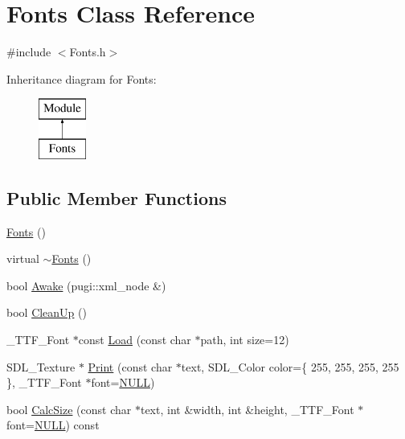 \hypertarget{class_fonts}{}\section{Fonts Class Reference}
\label{class_fonts}


{\ttfamily \#include $<$Fonts.\+h$>$}

Inheritance diagram for Fonts\+:\begin{figure}[H]
\begin{center}
\leavevmode
\includegraphics[height=2.000000cm]{class_fonts}
\end{center}
\end{figure}
\subsection*{Public Member Functions}
\begin{DoxyCompactItemize}
\item 
\mbox{\hyperlink{class_fonts_a45eefc38057ad57973216627645d60c9}{Fonts}} ()
\item 
virtual \mbox{\hyperlink{class_fonts_ac49e1c3974a649f120cfb46feb221d33}{$\sim$\+Fonts}} ()
\item 
bool \mbox{\hyperlink{class_fonts_aee8000727dca2b84dc46dacc35a9667b}{Awake}} (pugi\+::xml\+\_\+node \&)
\item 
bool \mbox{\hyperlink{class_fonts_afc4912317ca40199a71f7db1024c006d}{Clean\+Up}} ()
\item 
\+\_\+\+T\+T\+F\+\_\+\+Font $\ast$const \mbox{\hyperlink{class_fonts_aa8f815fd37417b05870d1719c42c249f}{Load}} (const char $\ast$path, int size=12)
\item 
S\+D\+L\+\_\+\+Texture $\ast$ \mbox{\hyperlink{class_fonts_ad027839894083559beb914ec51c6c5ac}{Print}} (const char $\ast$text, S\+D\+L\+\_\+\+Color color=\{ 255, 255, 255, 255 \}, \+\_\+\+T\+T\+F\+\_\+\+Font $\ast$font=\mbox{\hyperlink{_defs_8h_a070d2ce7b6bb7e5c05602aa8c308d0c4}{N\+U\+LL}})
\item 
bool \mbox{\hyperlink{class_fonts_a5210938601222509c4fd3756e2be59ae}{Calc\+Size}} (const char $\ast$text, int \&width, int \&height, \+\_\+\+T\+T\+F\+\_\+\+Font $\ast$font=\mbox{\hyperlink{_defs_8h_a070d2ce7b6bb7e5c05602aa8c308d0c4}{N\+U\+LL}}) const
\end{DoxyCompactItemize}
